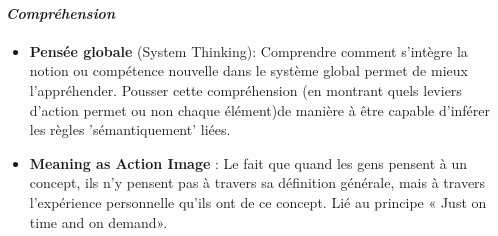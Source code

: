 			\paragraph{\emph{Compréhension}}
		\begin{itemize}
				\item {\textbf{Pensée globale} (System Thinking)}: Comprendre comment s'intègre la notion ou compétence nouvelle dans le système global permet de mieux l'appréhender. Pousser cette compréhension (en montrant quels leviers d'action permet ou non chaque élément)de manière à être capable d'inférer les règles 'sémantiquement' liées.
				\item {\textbf{Meaning as Action Image}} : Le fait que quand les gens pensent à un concept, ils n'y pensent pas à travers sa définition générale, mais à travers l'expérience personnelle qu'ils ont de ce concept. Lié au principe « Just on time and on demand».
		\end{itemize}	
